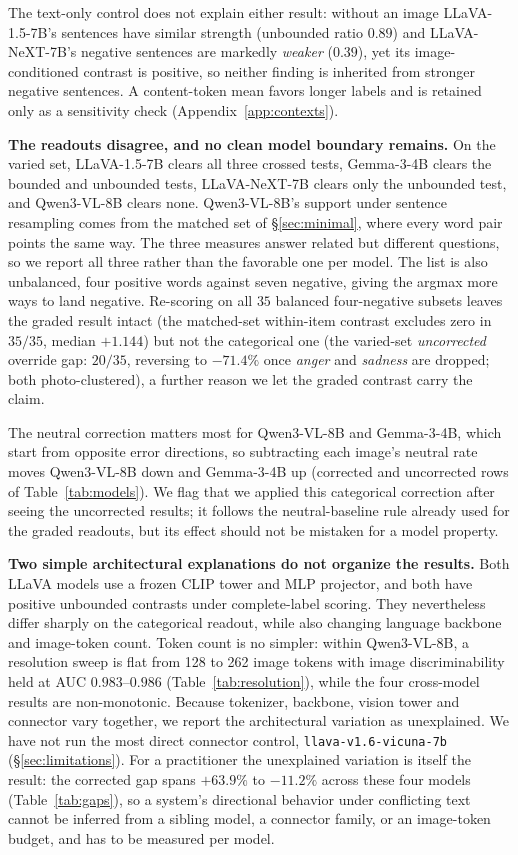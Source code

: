 \documentclass{article}
\newcommand{\gemma}{Gemma-3-4B}
\newcommand{\qwen}{Qwen3-VL-8B}
\newcommand{\llava}{LLaVA-1.5-7B}
\newcommand{\llavanext}{LLaVA-NeXT-7B}
\begin{document}
The text-only control does not explain either result: without an image \llava{}'s sentences have similar strength (unbounded ratio $0.89$) and \llavanext{}'s negative sentences are markedly \emph{weaker} ($0.39$), yet its image-conditioned contrast is positive, so neither finding is inherited from stronger negative sentences. A content-token mean favors longer labels and is retained only as a sensitivity check (Appendix~\ref{app:contexts}).

\textbf{The readouts disagree, and no clean model boundary remains.} On the varied set, \llava{} clears all three crossed tests, \gemma{} clears the bounded and unbounded tests, \llavanext{} clears only the unbounded test, and \qwen{} clears none. \qwen{}'s support under sentence resampling comes from the matched set of \S\ref{sec:minimal}, where every word pair points the same way. The three measures answer related but different questions, so we report all three rather than the favorable one per model. The list is also unbalanced, four positive words against seven negative, giving the argmax more ways to land negative. Re-scoring on all $35$ balanced four-negative subsets leaves the graded result intact (the matched-set within-item contrast excludes zero in $35/35$, median $+1.144$) but not the categorical one (the varied-set \emph{uncorrected} override gap: $20/35$, reversing to $-71.4\%$ once \emph{anger} and \emph{sadness} are dropped; both photo-clustered), a further reason we let the graded contrast carry the claim.

The neutral correction matters most for \qwen{} and \gemma{}, which start from opposite error directions, so subtracting each image's neutral rate moves \qwen{} down and \gemma{} up (corrected and uncorrected rows of Table~\ref{tab:models}). We flag that we applied this categorical correction after seeing the uncorrected results; it follows the neutral-baseline rule already used for the graded readouts, but its effect should not be mistaken for a model property.

\textbf{Two simple architectural explanations do not organize the results.} Both LLaVA models use a frozen CLIP tower and MLP projector, and both have positive unbounded contrasts under complete-label scoring. They nevertheless differ sharply on the categorical readout, while also changing language backbone and image-token count. Token count is no simpler: within \qwen{}, a resolution sweep is flat from 128 to 262 image tokens with image discriminability held at AUC $0.983$--$0.986$ (Table~\ref{tab:resolution}), while the four cross-model results are non-monotonic. Because tokenizer, backbone, vision tower and connector vary together, we report the architectural variation as unexplained. We have not run the most direct connector control, \texttt{llava-v1.6-vicuna-7b} (\S\ref{sec:limitations}). For a practitioner the unexplained variation is itself the result: the corrected gap spans $+63.9\%$ to $-11.2\%$ across these four models (Table~\ref{tab:gaps}), so a system's directional behavior under conflicting text cannot be inferred from a sibling model, a connector family, or an image-token budget, and has to be measured per model.
\end{document}
